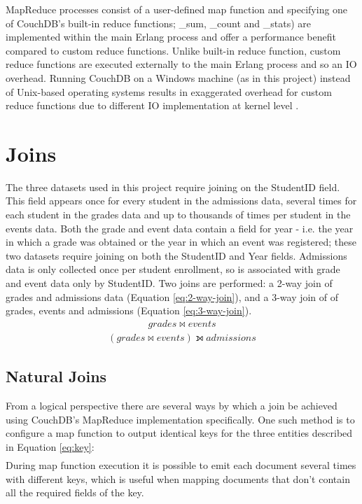 MapReduce processes consist of a user-defined map function and specifying one of CouchDB's built-in reduce functions; \_sum, \_count and \_stats) are implemented within the main Erlang process and offer a performance benefit compared to custom reduce functions. Unlike built-in reduce function, custom reduce functions are executed externally to the main Erlang process and so an IO overhead. Running CouchDB on a Windows machine (as in this project) instead of Unix-based operating systems results in exaggerated overhead for custom reduce functions due to different IO implementation at kernel level \cite{slack1Nov}.

\section{Joins}
The three datasets used in this project require joining on the StudentID field. This field appears once for every student in the admissions data, several times for each student in the grades data and up to thousands of times per student in the events data. Both the grade and event data contain a field for year - i.e. the year in which a grade was obtained or the year in which an event was registered; these two datasets require joining on both the StudentID and Year fields. Admissions data is only collected once per student enrollment, so is associated with grade and event data only by StudentID. Two joins are performed: a 2-way join of grades and admissions data (Equation \ref{eq:2-way-join}), and a 3-way join of of grades, events and admissions (Equation \ref{eq:3-way-join}).
\begin{align}
  grades \bowtie events\label{eq:2-way-join}
\end{align}
\begin{align}
  (grades \bowtie events) \leftouterjoin admissions\label{eq:3-way-join}
\end{align}

\subsection{Natural Joins}
From a logical perspective there are several ways by which a join be achieved using CouchDB's MapReduce implementation specifically. One such method is to configure a map function to output identical keys for the three entities described in Equation \ref{eq:key}:
\begin{align}
  [studentNumber,courseCode,year]\label{eq:key}
\end{align}
During map function execution it is possible to emit each document several times with different keys, which is useful when mapping documents that don't contain all the required fields of the key.

